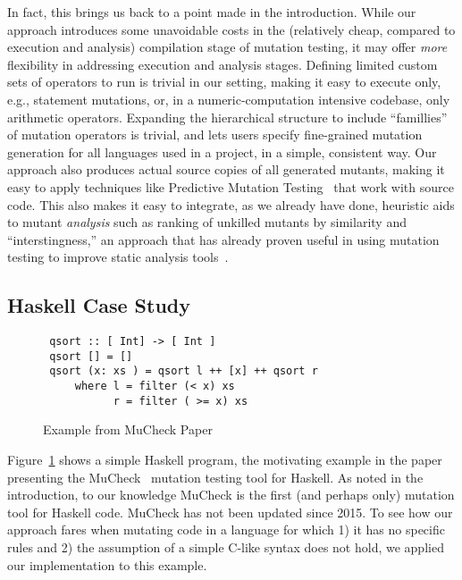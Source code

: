 \documentclass[sigconf,review, anonymous]{acmart}
\begin{document}
{In fact, this brings us back to a point made in the introduction.
While our approach introduces some unavoidable costs in the
(relatively cheap, compared to execution and analysis) compilation stage of
mutation testing, it may offer \emph{more} flexibility in addressing
execution and analysis stages.  Defining limited custom sets of
operators to run is trivial in our setting, making it easy to
execute only, e.g., statement mutations, or, in a numeric-computation
intensive codebase, only arithmetic operators.  Expanding the
hierarchical structure to include ``famillies'' of mutation operators
is trivial, and lets users specify fine-grained mutation
generation for all languages used in a project, in a simple, consistent way.  Our approach also produces actual source
copies of all generated mutants, making it easy to apply techniques
like Predictive Mutation Testing~\cite{zhangPMT} that work with source
code.  This also makes it easy to integrate, as we already have done, heuristic
aids to mutant \emph{analysis} such as ranking of unkilled mutants by
similarity and ``interstingness,'' an approach that has already proven
useful in using mutation testing to improve static analysis tools~\cite{StatMut}.

\subsection{Haskell Case Study}

\begin{figure}

\begin{lstlisting}
 qsort :: [ Int] -> [ Int ]
 qsort [] = []
 qsort (x: xs ) = qsort l ++ [x] ++ qsort r
     where l = filter (< x) xs
           r = filter ( >= x) xs
\end{lstlisting}
\caption{\small Example from MuCheck Paper~\cite{mucheck}}
\label{fig:haskell}
\end{figure}

Figure~\ref{fig:haskell} shows a simple Haskell program, the
motivating example in the paper presenting the MuCheck~\cite{mucheck}
mutation testing tool for Haskell.  As noted in the introduction, to our
knowledge MuCheck is the first (and perhaps only) mutation tool for
Haskell code.  MuCheck has not been updated since 2015.
To see how our approach fares when mutating code in a language for
which 1) it has no specific rules and 2) the assumption of a simple
C-like syntax does not hold, we applied our implementation to this example.

}
\end{document}
